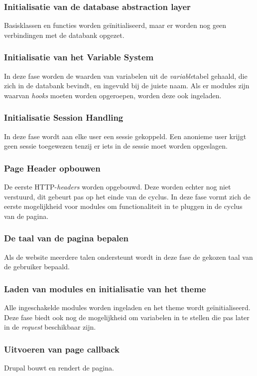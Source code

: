 \subsubsection{Initialisatie van de database abstraction layer}
Basisklassen en functies worden ge\"{i}nitialiseerd, maar er worden nog geen verbindingen met de databank opgezet.

\subsubsection{Initialisatie van het Variable System}
In deze fase worden de waarden van variabelen uit de \textit{variable}tabel gehaald, die zich in de databank bevindt, en ingevuld bij de juiste naam. Als er modules zijn waarvan \textit{hooks} moeten worden opgeroepen, worden deze ook ingeladen.

\subsubsection{Initialisatie Session Handling}
In deze fase wordt aan elke user een sessie gekoppeld. Een anonieme user krijgt geen sessie toegewezen tenzij er iets in de sessie moet worden opgeslagen.

\subsubsection{Page Header opbouwen}
De eerste HTTP-\textit{headers} worden opgebouwd. Deze worden echter nog niet verstuurd, dit gebeurt pas op het einde van de cyclus. In deze fase vormt zich de eerste mogelijkheid voor modules om functionaliteit in te pluggen in de cyclus van de pagina.

\subsubsection{De taal van de pagina bepalen}
Als de website meerdere talen ondersteunt wordt in deze fase de gekozen taal van de gebruiker bepaald.

\subsubsection{Laden van modules en initialisatie van het theme}
Alle ingeschakelde modules worden ingeladen en het theme wordt ge\"{i}nitialiseerd. Deze fase biedt ook nog de mogelijkheid om variabelen in te stellen die pas later in de \textit{request} beschikbaar zijn.

\subsubsection{Uitvoeren van page callback}
Drupal bouwt en rendert de pagina.

